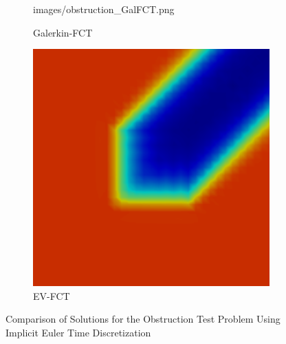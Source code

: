 \begin{figure}[ht]
\begin{subfigure}{0.3\textwidth}
        {images/obstruction_GalFCT.png}
      \caption{Galerkin-FCT}
   \end{subfigure}
   \begin{subfigure}{0.3\textwidth}
      \includegraphics[width=\textwidth]
        {images/obstruction_EVFCT.png}
      \caption{EV-FCT}
   \end{subfigure}
   \caption{Comparison of Solutions for the Obstruction Test
     Problem Using Implicit Euler Time Discretization}
   \label{fig:obstruction_be}
\end{figure}

